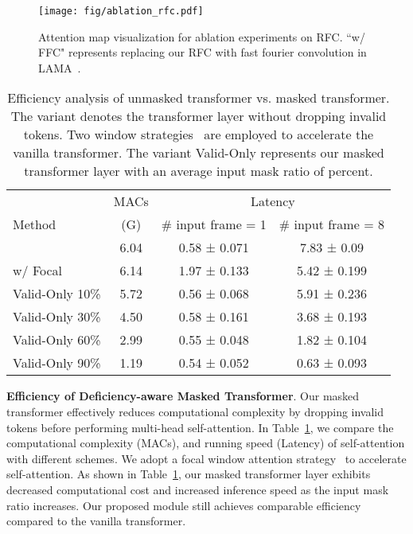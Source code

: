 \documentclass[10pt,twocolumn,letterpaper]{article}
\def\fullamount{\textcolor{yyellow}{}}
\begin{document}
\begin{figure}[t]
  \centering
\texttt{[image: fig/ablation\_rfc.pdf]}
\caption{Attention map visualization for ablation experiments on RFC. ``w/ FFC" represents replacing our RFC with fast fourier convolution in LAMA~\cite{suvorov22lama}.}\label{fig:rfc_study}
\end{figure}


\begin{table}[b]
\centering
\caption{Efficiency analysis of unmasked transformer vs. masked transformer. The variant \fullamount{} denotes the transformer layer without dropping invalid tokens. Two window strategies~\cite{yang21focal} are employed to accelerate the vanilla transformer. The variant Valid-Only  represents our masked transformer layer with an average input mask ratio of  percent.}
\label{tab:speed_attention}
\small
\setlength{\tabcolsep}{2.9pt}
\begin{tabular}{l|c|cc}
\toprule \rowcolor{TableHead}
& MACs & \multicolumn{2}{c}{Latency} \\ \rowcolor{TableHead}
Method                     & (G) & \# input frame = 1 & \# input frame = 8  \\ \midrule 
\fullamount{}                       & 6.04 & 0.58 ± 0.071  &  7.83 ± 0.09     \\
\fullamount{} w/ Focal~\cite{yang21focal}                & 6.14 & 1.97 ± 0.133 &  5.42 ± 0.199      \\ \midrule
\rowcolor{RowColor}
Valid-Only 10\%                    & 5.72 & 0.56 ± 0.068  & 5.91 ± 0.236 \\ \rowcolor{RowColor}
Valid-Only 30\%                    & 4.50  & 0.58 ± 0.161 & 3.68 ± 0.193    \\ \rowcolor{RowColor}
Valid-Only 60\%                    & 2.99 & 0.55 ± 0.048 & 1.82 ± 0.104   \\ \rowcolor{RowColor}
Valid-Only 90\%                    & 1.19 & 0.54 ± 0.052 & 0.63 ± 0.093    \\
 \bottomrule
\end{tabular}
\vspace{-2mm}
\end{table} 
\noindent
\textbf{Efficiency of Deficiency-aware Masked Transformer}. Our masked transformer effectively reduces computational complexity by dropping invalid tokens before performing multi-head self-attention. In Table~\ref{tab:speed_attention}, we compare the computational complexity (MACs), and running speed (Latency) of self-attention with different schemes. We adopt a focal window attention strategy~\cite{yang21focal} to accelerate self-attention. As shown in Table~\ref{tab:speed_attention}, our masked transformer layer exhibits decreased computational cost and increased inference speed as the input mask ratio increases. Our proposed module still achieves comparable efficiency compared to the vanilla transformer. 
\end{document}
